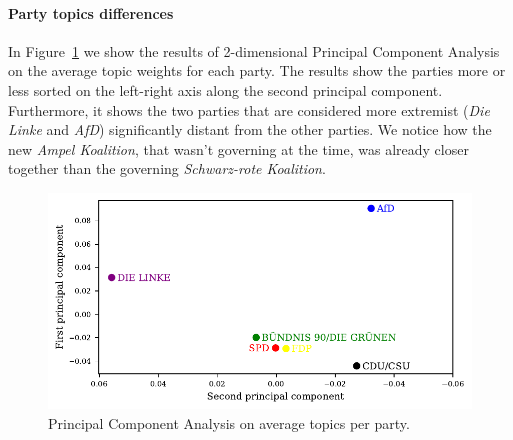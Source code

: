 \documentclass{article}
\begin{document}
\paragraph{Party topics differences}
In Figure~\ref{pca_plot} we show the results of 2-dimensional Principal Component Analysis on the average topic weights for each party.
The results show the parties more or less sorted on the left-right axis along the second principal component.
Furthermore, it shows the two parties that are considered more extremist (\textit{Die Linke} and \textit{AfD}) significantly distant from the other parties.
We notice how the new \textit{Ampel Koalition}, that wasn't governing at the time, was already closer together than the governing \textit{Schwarz-rote Koalition}.

\begin{figure}
  \centering
  \includegraphics[width=0.9\linewidth]{images/pca.pdf}
  \captionsetup{width=0.9\linewidth}
  \caption{
    Principal Component Analysis on average topics per party.
  }
  \label{pca_plot}
\end{figure}
\end{document}
